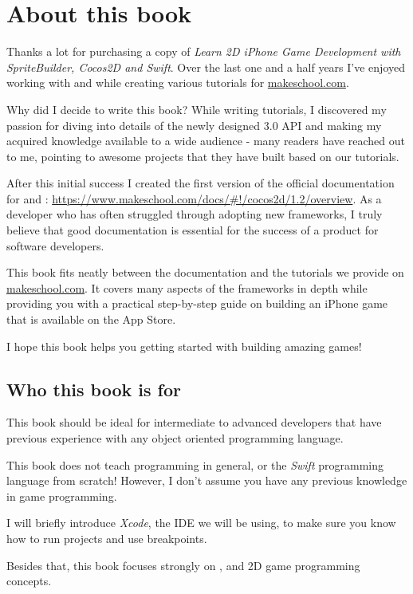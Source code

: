 \chapter{About this book}

Thanks a lot for purchasing a copy of \textit{Learn 2D iPhone Game Development
with SpriteBuilder, Cocos2D and Swift}. Over the last one and a half years I've
enjoyed working with \SB{} and \cocos{} while creating various tutorials for
\url{makeschool.com}. 

Why did I decide to write this book? While writing tutorials, I discovered my
passion for diving into details of the newly designed \cocos{} 3.0 API and
making my acquired knowledge available to a wide audience - many readers
have reached out to me, pointing to awesome projects that they have built based
on our tutorials.

After this initial success I created the first version of the official
documentation for \SB{} and \cocos{}:
\url{https://www.makeschool.com/docs/#!/cocos2d/1.2/overview}. As a developer
who has often struggled through adopting new frameworks, I truly believe that
good documentation is essential for the success of a product for software
developers.

This book fits neatly between the documentation and the tutorials we provide on
\url{makeschool.com}. It covers many aspects of the frameworks in depth while
providing you with a practical step-by-step guide on building an iPhone game that is available on the
App Store.

I hope this book helps you getting started with building amazing games!

\section{Who this book is for}
This book should be ideal for intermediate to advanced developers that have
previous experience with any object oriented programming language.

This book does not teach programming in general, or the \textit{Swift}
programming language from scratch! However, I don't assume you have any previous
knowledge in game programming.

I will briefly introduce \textit{Xcode}, the IDE we will be using, to make
sure you know how to run projects and use breakpoints. %

Besides that, this book focuses strongly on \SB{}, \cocos{} and 2D game
programming concepts. 

